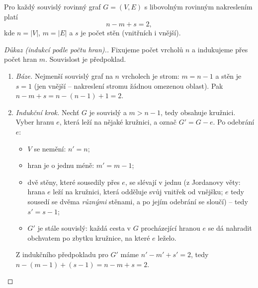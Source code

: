 \documentclass[11pt,a4paper]{article}
\begin{document}
\begin{center}
\end{center}

\begin{veta}
Pro každý souvislý rovinný graf $G=(V,E)$ s libovolným rovinným nakreslením platí
\[ n-m+s=2, \]
kde $n=|V|$, $m=|E|$ a $s$ je počet stěn (vnitřních i vnější).
\end{veta}

\begin{proof}[Důkaz (indukcí podle počtu hran).]
Fixujeme počet vrcholů $n$ a indukujeme přes počet hran $m$. Souvislost je předpoklad.
\begin{enumerate}[label=(\arabic*)]
  \item \emph{Báze.} Nejmenší souvislý graf na $n$ vrcholech je strom: $m=n-1$ a stěn je $s=1$ (jen vnější -- nakreslení stromu  žádnou omezenou oblast). Pak $n-m+s=n-(n-1)+1=2$.
  \item \emph{Indukční krok.} Nechť $G$ je souvislý a $m>n-1$, tedy obsahuje kružnici. Vyber hranu $e$, která leží na nějaké kružnici, a označ $G'=G-e$. Po odebrání $e$:
    \begin{itemize}
      \item $V$ se nemění: $n'=n$;
      \item hran je o jednu méně: $m'=m-1$;
      \item dvě stěny, které sousedily přes $e$, se slévají v jednu (z Jordanovy věty: hrana $e$ leží na kružnici, která odděluje svůj vnitřek od vnějšku; $e$ tedy sousedí se dvěma \emph{různými} stěnami, a po jejím odebrání se sloučí) -- tedy $s'=s-1$;
      \item $G'$ je stále souvislý: každá cesta v $G$ procházející hranou $e$ se dá nahradit obchvatem po zbytku kružnice, na které $e$ leželo.
    \end{itemize}
    Z indukčního předpokladu pro $G'$ máme $n'-m'+s'=2$, tedy $n-(m-1)+(s-1)=n-m+s=2$.
\end{enumerate}
\end{proof}
\end{document}
